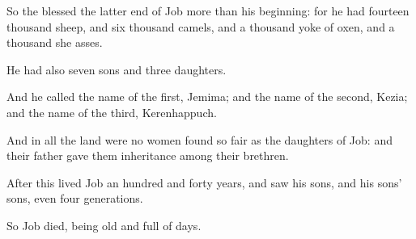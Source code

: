 \verse So the \LORD blessed the latter end of Job more than his beginning: for he had fourteen thousand sheep, and six thousand camels, and a thousand yoke of oxen, and a thousand she asses.

\verse He had also seven sons and three daughters.

\verse And he called the name of the first, Jemima; and the name of the second, Kezia; and the name of the third, Kerenhappuch.

\verse And in all the land were no women found so fair as the daughters of Job: and their father gave them inheritance among their brethren.

\verse After this lived Job an hundred and forty years, and saw his sons, and his sons' sons, even four generations.

\verse So Job died, being old and full of days.

